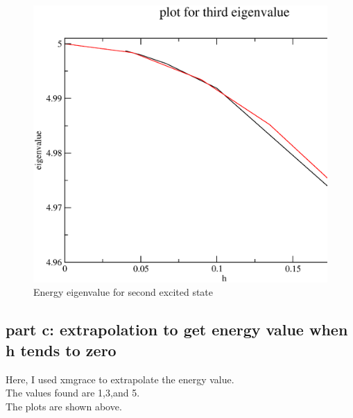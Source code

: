 \documentclass[11pt,a4paper,english]{article}
\begin{document}
	\begin{figure}[h!]
	\centering
	\includegraphics [scale=0.6]{e2.eps}
	\caption{Energy eigenvalue for second excited state }
	\end{figure}
	\clearpage
    
   \subsection{part c: extrapolation to get energy value when h tends to zero}
	
	Here, I used xmgrace to extrapolate the energy value.\\
	The values found are 1,3,and 5.\\
	The plots are shown above.\\	
\end{document}
